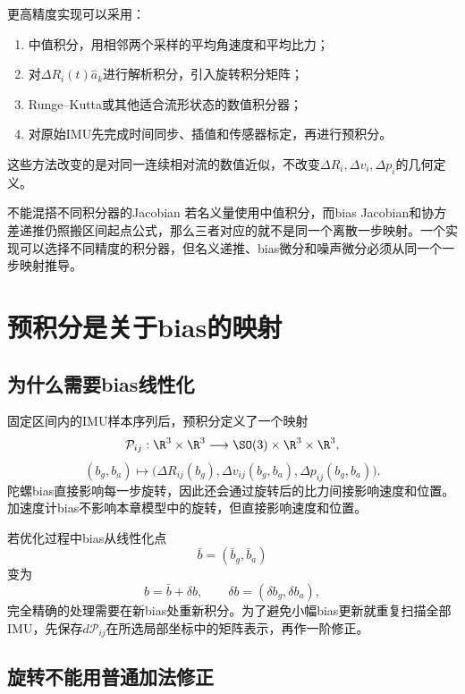 更高精度实现可以采用：
\begin{enumerate}
    \item 中值积分，用相邻两个采样的平均角速度和平均比力；
    \item 对$\Delta R_i(t)\widehat a_k$进行解析积分，引入旋转积分矩阵；
    \item Runge--Kutta或其他适合流形状态的数值积分器；
    \item 对原始IMU先完成时间同步、插值和传感器标定，再进行预积分。
\end{enumerate}
这些方法改变的是对同一连续相对流的数值近似，不改变$\Delta R_i,\Delta v_i,\Delta p_i$的几何定义。

\begin{imucase}{不能混搭不同积分器的Jacobian}
若名义量使用中值积分，而bias Jacobian和协方差递推仍照搬区间起点公式，那么三者对应的就不是同一个离散一步映射。一个实现可以选择不同精度的积分器，但名义递推、bias微分和噪声微分必须从同一个一步映射推导。
\end{imucase}


\section{预积分是关于bias的映射}

\subsection{为什么需要bias线性化}

固定区间内的IMU样本序列后，预积分定义了一个映射
\[
    \mathcal P_{ij}:
    \R^3\times\R^3
    \longrightarrow
    \SO(3)\times\R^3\times\R^3,
\]
\[
    (b_g,b_a)
    \longmapsto
    \bigl(
        \Delta R_{ij}(b_g),
        \Delta v_{ij}(b_g,b_a),
        \Delta p_{ij}(b_g,b_a)
    \bigr).
\]
陀螺bias直接影响每一步旋转，因此还会通过旋转后的比力间接影响速度和位置。加速度计bias不影响本章模型中的旋转，但直接影响速度和位置。

若优化过程中bias从线性化点
\[
    \bar b=(\bar b_g,\bar b_a)
\]
变为
\[
    b=\bar b+\delta b,
    \qquad
    \delta b=(\delta b_g,\delta b_a),
\]
完全精确的处理需要在新bias处重新积分。为了避免小幅bias更新就重复扫描全部IMU，先保存$d\mathcal P_{ij}$在所选局部坐标中的矩阵表示，再作一阶修正。

\subsection{旋转不能用普通加法修正}

